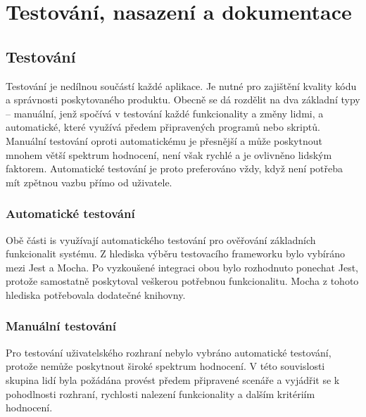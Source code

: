 \chapter{Testování, nasazení a dokumentace}


\section{Testování}

Testování je nedílnou součástí každé aplikace. Je nutné pro zajištění kvality kódu a správnosti poskytovaného produktu. Obecně se dá rozdělit na dva základní typy -- manuální, jenž spočívá v testování každé funkcionality a změny lidmi, a automatické, které využívá předem připravených programů nebo skriptů. Manuální testování oproti automatickému je přesnější a může poskytnout mnohem větší spektrum hodnocení, není však rychlé a je ovlivněno lidským faktorem. Automatické testování je proto preferováno vždy, když není potřeba mít zpětnou vazbu přímo od uživatele.



\subsection{Automatické testování}

Obě části \gls{is} využívají automatického testování pro ověřování základních funkcionalit systému. Z hlediska výběru testovacího frameworku bylo vybíráno mezi Jest a Mocha. Po vyzkoušené integraci obou bylo rozhodnuto ponechat Jest, protože samostatně poskytoval veškerou potřebnou funkcionalitu. Mocha z tohoto hlediska potřebovala dodatečné knihovny.


\subsection{Manuální testování}

Pro testování uživatelského rozhraní nebylo vybráno automatické testování, protože nemůže poskytnout široké spektrum hodnocení. V této souvislosti skupina lidí byla požádána provést předem připravené scenáře a vyjádřit se k pohodlnosti rozhraní, rychlosti nalezení funkcionality a dalším kritériím hodnocení. 


